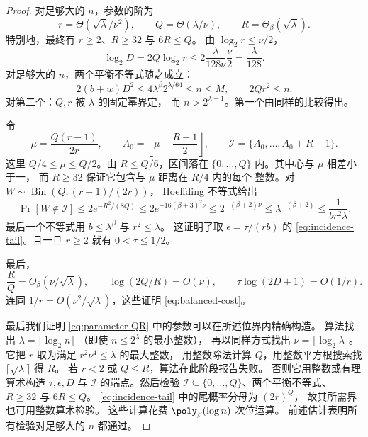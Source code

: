 \begin{proof}
对足够大的 $n$，参数的阶为
\[
 r=\Theta(\sqrt\lambda/\nu^2),\qquad
 Q=\Theta(\lambda/\nu),\qquad R=\Theta_\beta(\sqrt\lambda).
\]
特别地，最终有 $r\ge2$、$R\ge32$ 与 $6R\le Q$。
由 $\log_2 r\le\nu/2$，
\[
 \log_2 D=2Q\log_2 r
 \le2\frac{\lambda}{128\nu}\frac\nu2=\frac{\lambda}{128}.
\]
对足够大的 $n$，两个平衡不等式随之成立：
\[
 2(b+w)D^2\le4\lambda^\beta2^{\lambda/64}\le n\le M,
 \qquad 2Qr^2\le n.
\]
对第二个：$Q,r$ 被 $\lambda$ 的固定幂界定，
而 $n>2^{\lambda-1}$。第一个由同样的比较得出。

令
\[
 \mu=\frac{Q(r-1)}{2r},\qquad
 A_0=\left\lfloor\mu-\frac{R-1}{2}\right\rfloor,
 \qquad \mathcal I=\{A_0,\ldots,A_0+R-1\}.
\]
这里 $Q/4\le\mu\le Q/2$。由 $R\le Q/6$，区间落在
$\{0,\ldots,Q\}$ 内。其中心与 $\mu$ 相差小于一，
而 $R\ge32$ 保证它包含与 $\mu$ 距离在 $R/4$ 内的每个
整数。对 $W\sim\operatorname{Bin}(Q,(r-1)/(2r))$，
Hoeffding 不等式给出
\[
 \Pr[W\notin\mathcal I]
 \le2e^{-R^2/(8Q)}
 \le2e^{-16(\beta+3)^2\nu}
 \le2^{-(\beta+2)\nu}
 \le\lambda^{-(\beta+2)}
 \le\frac1{br^2\lambda}.
\]
最后一个不等式用 $b\le\lambda^\beta$ 与 $r^2\le\lambda$。
这证明了取 $\epsilon=\tau/(rb)$ 的
\eqref{eq:incidence-tail}。且一旦 $r\ge2$ 就有
$0<\tau\le1/2$。

最后，
\[
 \frac RQ=O_\beta(\nu/\sqrt\lambda),\qquad
 \log(2Q/R)=O(\nu),\qquad
 \tau\log(2D+1)=O(1/r).
\]
连同 $1/r=O(\nu^2/\sqrt\lambda)$，这些证明
\eqref{eq:balanced-cost}。

最后我们证明 \eqref{eq:parameter-QR}
中的参数可以在所述位界内精确构造。
算法找出 $\lambda=\lceil\log_2 n\rceil$
（即使 $n\le2^\lambda$ 的最小整数），
再以同样方式找出 $\nu=\lceil\log_2\lambda\rceil$。
它把 $r$ 取为满足 $r^2\nu^4\le\lambda$ 的最大整数，
用整数除法计算 $Q$，用整数平方根搜索找
$\lceil\sqrt\lambda\rceil$ 得 $R$。
若 $r<2$ 或 $Q\le R$，算法在此阶段报告失败。
否则它用整数或有理算术构造 $\tau,\epsilon,D$
与 $\mathcal I$ 的端点。然后检验
$\mathcal I\subseteq\{0,\ldots,Q\}$、两个平衡不等式、
$R\ge32$ 与 $6R\le Q$。
\eqref{eq:incidence-tail} 中的尾概率分母为 $(2r)^Q$，
故其所需界也可用整数算术检验。
这些计算花费 $\poly_\beta(\log n)$ 次位运算。
前述估计表明所有检验对足够大的 $n$ 都通过。
\end{proof}
